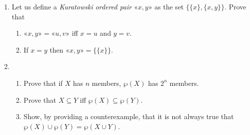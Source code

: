 {\begin{enumerate}
\item Let us define a \emph{Kuratowski ordered pair} $« x,y»$ as the set $\{\{x\},\{x,y\}\}$. Prove that \begin{enumerate} 
	\item $« x,y» = « u,v»$ iff $x=u$ and $y=v$.
	\item If $x=y$ then $« x,y» = \{\{x\}\}$.
\end{enumerate}

\item \begin{enumerate}
	\item Prove that if $X$ has $n$ members, $\wp(X)$ has $2^{n}$ members.
	\item Prove that $X \subseteq Y$ iff $\wp(X) \subseteq \wp(Y)$.
	\item Show, by providing a counterexample, that it is not always true that $\wp(X) \cup \wp(Y) = \wp(X \cup Y)$.
\end{enumerate}



\end{enumerate}}
